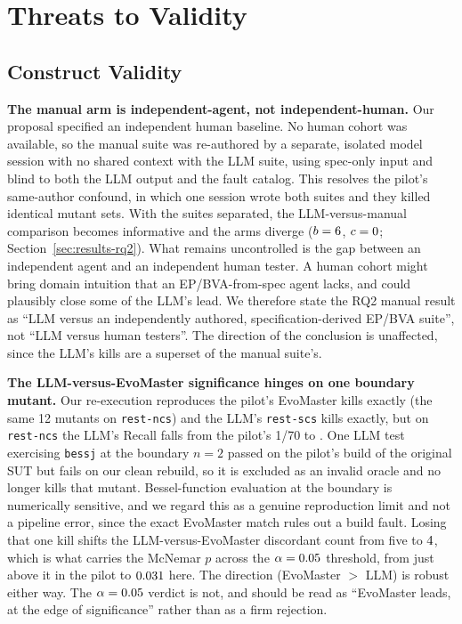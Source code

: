 \section{Threats to Validity}
\label{sec:threats}

\subsection{Construct Validity}

\textbf{The manual arm is independent-agent, not independent-human.} Our proposal specified an
independent human baseline. No human cohort was available, so the manual suite was re-authored
by a separate, isolated model session with no shared context with the LLM suite, using
spec-only input and blind to both the LLM output and the fault catalog. This resolves the
pilot's same-author confound, in which one session wrote both suites and they killed identical
mutant sets. With the suites separated, the LLM-versus-manual comparison becomes informative
and the arms diverge ($b=6$, $c=0$;
Section~\ref{sec:results-rq2}). What remains uncontrolled is the gap between an independent
agent and an independent human tester. A human cohort might bring domain intuition that an
EP/BVA-from-spec agent lacks, and could plausibly close some of the LLM's lead. We therefore
state the RQ2 manual result as ``LLM versus an independently authored, specification-derived
EP/BVA suite'', not ``LLM versus human testers''. The direction of the conclusion is
unaffected, since the LLM's kills are a superset of the manual suite's.

\textbf{The LLM-versus-EvoMaster significance hinges on one boundary mutant.}
Our re-execution reproduces the pilot's EvoMaster kills exactly (the same 12
mutants on \texttt{rest-ncs}) and the LLM's \texttt{rest-scs} kills exactly, but on
\texttt{rest-ncs} the LLM's Recall falls from the pilot's 1/70 to \RQIINcsLlm{}. One LLM test
exercising \texttt{bessj} at the boundary $n=2$ passed on the pilot's build of the original SUT
but fails on our clean rebuild, so it is excluded as an invalid oracle and no longer kills that
mutant. Bessel-function evaluation at the boundary is numerically sensitive, and we regard
this as a genuine reproduction limit and not a pipeline error, since the exact EvoMaster
match rules out a build fault. Losing that one kill shifts the LLM-versus-EvoMaster discordant
count from five to $4$, which is what carries the McNemar $p$ across the
$\alpha=0.05$ threshold, from just above it in the pilot to $0.031$ here. The
direction (EvoMaster $>$ LLM) is robust either way. The $\alpha=0.05$ verdict is not, and
should be read as ``EvoMaster leads, at the edge of significance'' rather than as a firm
rejection.

